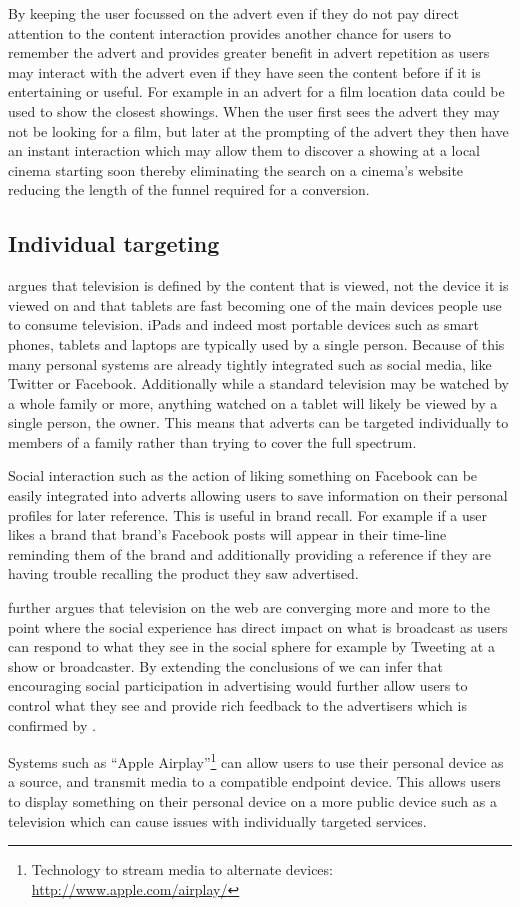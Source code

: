 By keeping the user focussed on the advert even if they do not pay direct attention to the content interaction provides another chance for users to remember the advert and provides greater benefit in advert repetition as users may interact with the advert even if they have seen the content before if it is entertaining or useful. For example in an advert for a film location data could be used to show the closest showings. When the user first sees the advert they may not be looking for a film, but later at the prompting of the advert they then have an instant interaction which may allow them to discover a showing at a local cinema starting soon thereby eliminating the search on a cinema's website reducing the length of the funnel required for a conversion.

\subsection{Individual targeting}
\citep{socialTVPaper} argues that television is defined by the content that is viewed, not the device it is viewed on and that tablets are fast becoming one of the main devices people use to consume television. iPads and indeed most portable devices such as smart phones, tablets and laptops are typically used by a single person. Because of this many personal systems are already tightly integrated such as social media, like Twitter or Facebook. Additionally while a standard television may be watched by a whole family or more, anything watched on a tablet will likely be viewed by a single person, the owner. This means that adverts can be targeted individually to members of a family rather than trying to cover the full spectrum.

Social interaction such as the action of liking something on Facebook can be easily integrated into adverts allowing users to save information on their personal profiles for later reference. This is useful in brand recall. For example if a user likes a brand that brand's Facebook posts will appear in their time-line reminding them of the brand and additionally providing a reference if they are having trouble recalling the product they saw advertised.

\citep{socialTVPaper} further argues that television on the web are converging more and more to the point where the social experience has direct impact on what is broadcast as users can respond to what they see in the social sphere for example by Tweeting at a show or broadcaster. By extending the conclusions of \citep{socialTVPaper} we can infer that encouraging social participation in advertising would further allow users to control what they see and provide rich feedback to the advertisers which is confirmed by \citep{socialTV}.

Systems such as ``Apple Airplay''\footnote{Technology to stream media to alternate devices: \url{http://www.apple.com/airplay/}} can allow users to use their personal device as a source, and transmit media to a compatible endpoint device. This allows users to display something on their personal device on a more public device such as a television which can cause issues with individually targeted services.